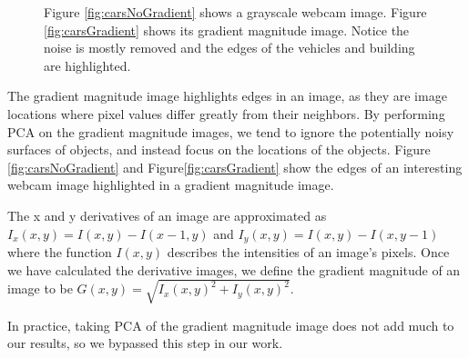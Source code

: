 \begin{figure}[htp]
	\centering
		\caption[Highlighting object edges with gradient magnitude images.]{Figure \ref{fig:carsNoGradient} shows a grayscale webcam image. Figure \ref{fig:carsGradient} shows its gradient magnitude image.  Notice the noise is mostly removed and the edges of the vehicles and building are highlighted.}
\end{figure}

The gradient magnitude image highlights edges in an image, as they are image locations where pixel values differ greatly from their neighbors.  By performing PCA on the gradient magnitude images, we tend to ignore the potentially noisy surfaces of objects, and instead focus on the locations of the objects.  Figure \ref{fig:carsNoGradient} and Figure\ref{fig:carsGradient} show the edges of an interesting webcam image highlighted in a gradient magnitude image.


The x and y derivatives of an image are approximated as $I_x(x,y) = I(x,y)-I(x-1,y)$ and $I_y(x,y) = I(x,y)-I(x,y-1)$ where the function $I(x,y)$ describes the intensities of an image's pixels.  Once we have calculated the derivative images, we define the gradient magnitude of an image to be $G(x,y) = \sqrt{I_x(x,y)^2 + I_y(x,y)^2}$.

In practice, taking PCA of the gradient magnitude image does not add much to our results, so we bypassed this step in our work.


